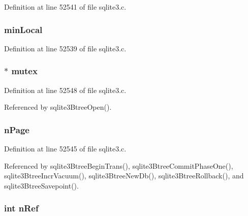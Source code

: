 Definition at line 52541 of file sqlite3.\+c.

\hypertarget{struct_bt_shared_acae49d06fe5c209d808832232cee4a00}{}
\subsubsection[{min\+Local}]{ min\+Local}\label{struct_bt_shared_acae49d06fe5c209d808832232cee4a00}


Definition at line 52539 of file sqlite3.\+c.

\hypertarget{struct_bt_shared_a7bcdded0e06fa908fe1a6df19c3dda21}{}
\subsubsection[{mutex}]{$\ast$ mutex}\label{struct_bt_shared_a7bcdded0e06fa908fe1a6df19c3dda21}


Definition at line 52548 of file sqlite3.\+c.



Referenced by sqlite3\+Btree\+Open().

\hypertarget{struct_bt_shared_a6b939842a27dd6c712b8a6f878bd0e89}{}
\subsubsection[{n\+Page}]{ n\+Page}\label{struct_bt_shared_a6b939842a27dd6c712b8a6f878bd0e89}


Definition at line 52545 of file sqlite3.\+c.



Referenced by sqlite3\+Btree\+Begin\+Trans(), sqlite3\+Btree\+Commit\+Phase\+One(), sqlite3\+Btree\+Incr\+Vacuum(), sqlite3\+Btree\+New\+Db(), sqlite3\+Btree\+Rollback(), and sqlite3\+Btree\+Savepoint().

\hypertarget{struct_bt_shared_a3c459f9ae278c22b72583c55ca01acb7}{}
\subsubsection[{n\+Ref}]{\setlength{\rightskip}{0pt plus 5cm}int n\+Ref}\label{struct_bt_shared_a3c459f9ae278c22b72583c55ca01acb7}


